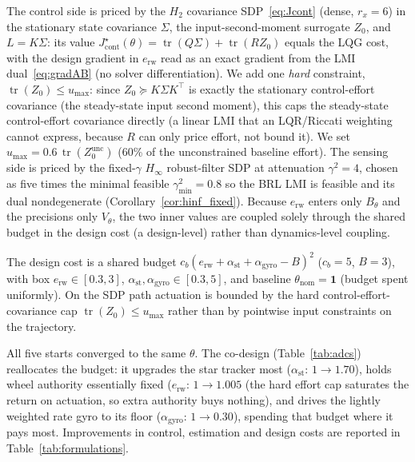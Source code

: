 \documentclass[twocolumn,amsthm]{autart}
\begin{document}
The control side is priced by the $H_2$ covariance SDP~\eqref{eq:Jcont} (dense,
$r_x=6$) in the stationary state covariance $\Sigma$, the input-second-moment
surrogate $Z_0$, and $L=K\Sigma$: its value
$J_{\mathrm{cont}}^\star(\theta)=\operatorname{tr}(Q\Sigma)+\operatorname{tr}(RZ_0)$
equals the LQG cost, with the design gradient in $e_{\mathrm{rw}}$ read as an exact
gradient from the LMI dual~\eqref{eq:gradAB} (no solver differentiation). We add one
\emph{hard} constraint, $\operatorname{tr}(Z_0)\le u_{\max}$: since
$Z_0\succeq K\Sigma K^\top$ is exactly the stationary control-effort covariance (the
steady-state input second moment), this caps the steady-state control-effort
covariance directly (a linear LMI that an LQR/Riccati weighting cannot
express, because $R$ can only price effort, not bound it). We set
$u_{\max}=0.6\,\operatorname{tr}(Z_0^{\mathrm{unc}})$ (60\% of the unconstrained
baseline effort). The sensing side is priced by the fixed-$\gamma$
$H_\infty$ robust-filter SDP at attenuation
$\gamma^2=4$, chosen as five times the minimal feasible $\gamma^2_{\min}=0.8$ so the
BRL LMI is feasible and its dual nondegenerate
(Corollary~\ref{cor:hinf_fixed}). Because $e_{\mathrm{rw}}$ enters only $B_\theta$ and the precisions only $V_\theta$, the two inner
values are coupled solely through the shared budget in the design cost (a
design-level) rather than dynamics-level coupling.

The design cost is a shared budget $c_b(e_{\mathrm{rw}}+\alpha_{\mathrm{st}}+
\alpha_{\mathrm{gyro}}-B)^2$ ($c_b=5$, $B=3$), with box
$e_{\mathrm{rw}}\in[0.3,3]$, $\alpha_{\mathrm{st}},\alpha_{\mathrm{gyro}}\in[0.3,5]$,
and baseline $\theta_{\mathrm{nom}}=\mathbf 1$ (budget spent uniformly). On the SDP
path actuation is bounded by the hard control-effort-covariance cap
$\operatorname{tr}(Z_0)\le u_{\max}$ rather than by pointwise input constraints on
the trajectory.

All five starts converged to the same $\theta$.
The co-design (Table~\ref{tab:adcs}) reallocates the budget:
it upgrades the star tracker most ($\alpha_{\mathrm{st}}\!:\,1\to1.70$), holds wheel
authority essentially fixed ($e_{\mathrm{rw}}\!:\,1\to1.005$ (the hard effort cap
saturates the return on actuation, so extra authority buys nothing), and drives the lightly weighted
rate gyro to its floor ($\alpha_{\mathrm{gyro}}\!:\,1\to0.30$), spending that budget
where it pays most. Improvements in control, estimation and design costs are reported in Table~\ref{tab:formulations}.
\end{document}
